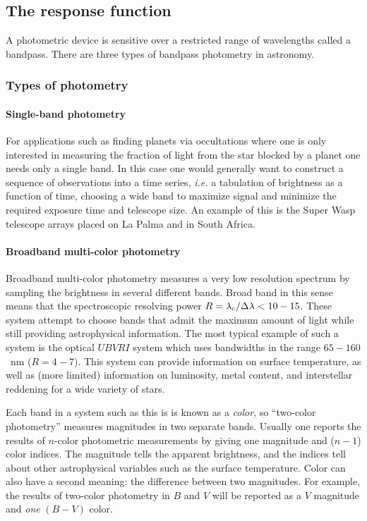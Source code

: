 \subsection{The response function}

A photometric device is sensitive over a restricted range of
wavelengths called a bandpass. There are three types of bandpass
photometry in astronomy.

\subsubsection{Types of photometry}

\paragraph{Single-band photometry} For applications such as finding
planets via occultations where one is only interested in measuring the
fraction of light from the star blocked by a planet one needs only a
single band. In this case one would generally want to construct a
sequence of observations into a time series, {\it i.e.} a tabulation
of brightness as a function of time, choosing a wide band to maximize
signal and minimize the required exposure time and telescope size. An
example of this is the Super Wasp telescope arrays placed on La Palma
and in South Africa.
\paragraph{Broadband multi-color photometry} Broadband multi-color
photometry measures a very low resolution spectrum by sampling the
brightness in several different bands. Broad band in this sense means
that the spectroscopic resolving power $R={\lambda_{\rm c}/\Delta
\lambda} < 10-15$. These system attempt to choose bands that admit the
maximum amount of light while still providing astrophysical
information. The most typical example of such a system is the optical $UBVRI$
system which uses bandwidths in the range $65-160$~nm ($R=4-7$). This
system can provide information on surface temperature, as well as
(more limited) information on luminosity, metal content, and
interstellar reddening for a wide variety of stars. 

Each band in a system such as this is is known as a {\it color}, so
``two-color photometry'' measures magnitudes in two separate
bands. Usually one reports the results of $n$-color photometric
measurements by giving one magnitude and ($n-1$) color indices. The
magnitude tells the apparent brightness, and the indices tell about
other astrophysical variables such as the surface temperature. Color
can also have a second meaning: the difference between two
magnitudes. For example, the results of two-color photometry in $B$ and
$V$ will be reported as a $V$ magnitude and {\it one} $(B-V)$ color.
